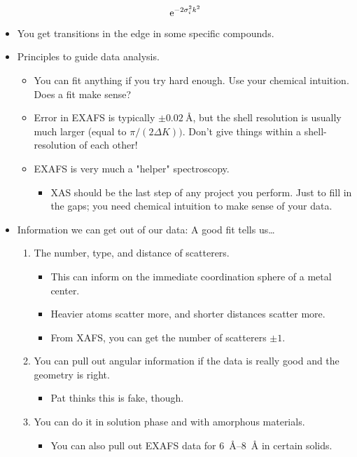 \documentclass[../notes.tex]{subfiles}
\begin{document}
\begin{itemize}
    \begin{equation*}
        \e[-2\sigma_i^2k^2]
    \end{equation*}
    \item You get transitions in the edge in some specific compounds.
    \item Principles to guide data analysis.
    \begin{itemize}
        \item You can fit anything if you try hard enough. Use your chemical intuition. Does a fit make sense?
        \item Error in EXAFS is typically $\pm\SI{0.02}{\angstrom}$, but the shell resolution is usually much larger (equal to $\pi/(2\Delta K))$. Don't give things within a shell-resolution of each other!
        \item EXAFS is very much a "helper" spectroscopy.
        \begin{itemize}
            \item XAS should be the last step of any project you perform. Just to fill in the gaps; you need chemical intuition to make sense of your data.
        \end{itemize}
    \end{itemize}
    \item Information we can get out of our data: A good fit tells us\dots
    \begin{enumerate}
        \item The number, type, and distance of scatterers.
        \begin{itemize}
            \item This can inform on the immediate coordination sphere of a metal center.
            \item Heavier atoms scatter more, and shorter distances scatter more.
            \item From XAFS, you can get the number of scatterers $\pm 1$.
        \end{itemize}
        \item You can pull out angular information if the data is really good and the geometry is right.
        \begin{itemize}
            \item Pat thinks this is fake, though.
        \end{itemize}
        \item You can do it in solution phase and with amorphous materials.
        \begin{itemize}
            \item You can also pull out EXAFS data for \SIrange{6}{8}{\angstrom} in certain solids.

\end{itemize}
\end{enumerate}
\end{itemize}
\end{document}
